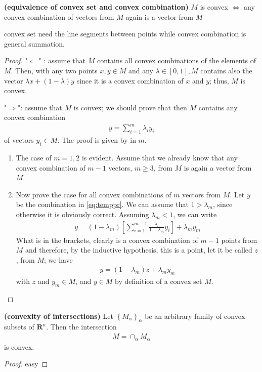 \documentclass{article}
\newcommand{\bfs}[1]{\textbf{({#1}) }}
\begin{document}
\begin{lema}{\bfs{equivalence of convex set and convex combination}}\label{eq:equ_conv}
$M$ is convex $\Longleftrightarrow$ any convex combination of vectors from $M$ again is a vector from $M$
\end{lema} 
\begin{rema}
convex set need the line segments between  points while convex combination is general  summation.
\end{rema}
\begin{proof}\color{ForestGreen}
"$\Leftarrow$" : assume that $M$ contains all convex combinations of the elements of $M$. Then, with any two points $x, y \in M$ and any $\lambda \in[0,1], M$ contains also the vector $\lambda x+(1-\lambda) y$ since it is a convex combination of $x$ and $y$; thus, $M$ is convex. 

"$\Rightarrow$": assume that $M$ is convex; we should prove that then $M$ contains any convex combination
\begin{align}
y=\sum_{i=1}^{m} \lambda_{i} y_{i}\label{eq:temppr}
\end{align}
of vectors $y_{i} \in M$. The proof is given by  in $m$. 
\begin{enumerate}
    \item The case of $m=1,2$ is evident. Assume that we already know that any convex combination of $m-1$ vectors, $m \geq 3$, from $M$ is again a vector from $M$.
    \item Now prove the case for all convex combinations of $m$ vectors from $M$. Let $y$ be the combination in \cref{eq:temppr}. We can assume that $1>\lambda_{m}$, since otherwise it is obviously correct. Assuming $\lambda_{m}<1$, we can write
\begin{align*}
y=\left(1-\lambda_{m}\right)\left[\sum_{i=1}^{m-1} \frac{\lambda_{i}}{1-\lambda_{m}} y_{i}\right]+\lambda_{m} y_{m}
\end{align*}
What is in the brackets, clearly is a convex combination of $m-1$ points from $M$ and therefore, by the inductive hypothesis, this is a point, let it be called $z$, from $M$; we have
\begin{align*}
y=\left(1-\lambda_{m}\right) z+\lambda_{m} y_{m}
\end{align*}
with $z$ and $y_{m} \in M$, and $y \in M$ by definition of a convex set $M$.
\end{enumerate}  
\end{proof} 
\begin{lema}{\bfs{convexity of intersections}}\label{lem:con_inter} Let $\left\{M_{\alpha}\right\}_{\alpha}$ be an arbitrary family of convex subsets of $\mathbf{R}^{n}$. Then the intersection
\begin{align*}
M=\cap_{\alpha} M_{\alpha}
\end{align*}
is convex.
\begin{proof}\color{ForestGreen}
easy
\end{proof}
\end{lema}
\end{document}
